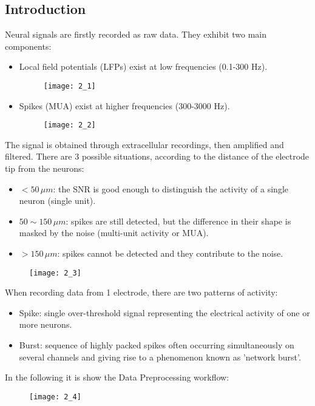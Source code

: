 \subsection{Introduction}
Neural signals are firstly recorded as raw data. They exhibit two
main components:
\begin{itemize}
    \item Local field potentials (LFPs) exist at low frequencies (0.1-300 Hz).
    \begin{figure}[H]
        \texttt{[image: 2\_1]}
        \centering
    \end{figure}
    \item Spikes (MUA) exist at higher frequencies (300-3000 Hz).
    \begin{figure}[H]
        \texttt{[image: 2\_2]}
        \centering
    \end{figure}
\end{itemize}
The signal is obtained through extracellular recordings,
then amplified and filtered. There are 3 possible situations, according to the
distance of the electrode tip from the neurons:
\begin{itemize}
    \item \(<50\,\mu{m}\): the SNR is good enough to distinguish the activity
    of a single neuron (single unit).
    \item \(50\sim150\,\mu{m}\): spikes are still detected, but the difference in
    their shape is masked by the noise (multi-unit activity or MUA).
    \item \(>150\,\mu{m}\): spikes cannot be detected and they contribute to
    the noise.
\end{itemize}
\begin{figure}[H]
    \texttt{[image: 2\_3]}
    \centering
\end{figure}
\newpage
When recording data from 1 electrode, there are two patterns of activity:
\begin{itemize}
    \item Spike: single over-threshold signal representing the electrical
    activity of one or more neurons.
    \item Burst: sequence of highly packed spikes often occurring simultaneously
    on several channels and giving rise to a phenomenon known as
    'network burst'.
\end{itemize}
In the following it is show the Data Preprocessing workflow:
\begin{figure}[H]
    \texttt{[image: 2\_4]}
    \centering
\end{figure}

